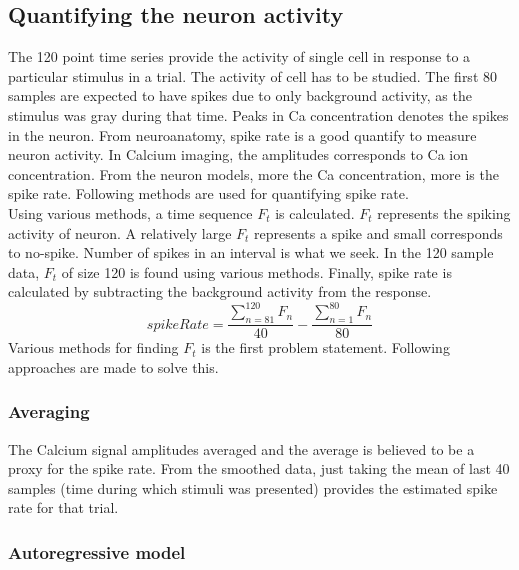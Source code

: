 \documentclass[11pt]{article}
\begin{document}
\subsection{Quantifying the neuron activity} %
\label{sub:quantifying_the_neuron_activity}
The 120 point time series provide the activity of single cell in response to a particular stimulus in a trial. The activity of cell has to be studied. The first 80 samples are expected to have spikes due to only background activity, as the stimulus was gray during that time. Peaks in Ca concentration denotes the spikes in the neuron. From neuroanatomy, spike rate is a good quantify to measure neuron activity. In Calcium imaging, the amplitudes corresponds to Ca ion concentration. From the neuron models, more the Ca concentration, more is the spike rate. Following methods are used for quantifying spike rate.\\
Using various methods, a time sequence $F_t$ is calculated. $F_t$ represents the spiking activity of neuron. A relatively large $F_t$ represents a spike and small corresponds to no-spike. Number of spikes in an interval is what we seek. In the 120 sample data, $F_t$ of size 120 is found using various methods. Finally, spike rate is calculated by subtracting the background activity from the response.
$$spikeRate = \frac{\sum_{n=81}^{120} F_n}{40} - \frac{\sum_{n=1}^{80} F_n}{80}$$
Various methods for finding $F_t$ is the first problem statement. Following approaches are made to solve this.
\subsubsection{Averaging } %
\label{ssub:averaging}
The Calcium signal amplitudes averaged and the average is believed to be a proxy for the spike rate. From the smoothed data, just taking the mean of last 40 samples (time during which stimuli was presented) provides the estimated spike rate for that trial.

\subsubsection{Autoregressive model} %
\label{ssub:ar_model}


\FloatBarrier
\end{document}
